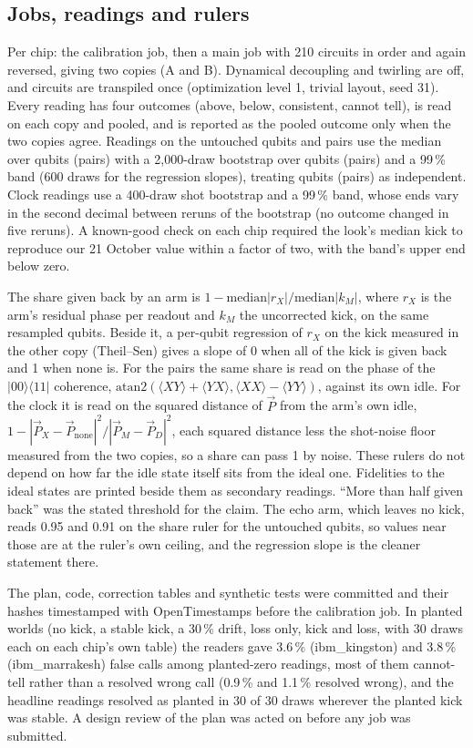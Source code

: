 \documentclass[reprint,amsmath,amssymb,aps,superscriptaddress,nofootinbib]{revtex4-2}
\begin{document}
\subsection{Jobs, readings and rulers}
Per chip: the calibration job, then a main job with 210 circuits in order and again reversed, giving two copies (A and B). Dynamical decoupling and twirling are off, and circuits are transpiled once (optimization level 1, trivial layout, seed 31). Every reading has four outcomes (above, below, consistent, cannot tell), is read on each copy and pooled, and is reported as the pooled outcome only when the two copies agree. Readings on the untouched qubits and pairs use the median over qubits (pairs) with a 2{,}000-draw bootstrap over qubits (pairs) and a 99\,\% band (600 draws for the regression slopes), treating qubits (pairs) as independent. Clock readings use a 400-draw shot bootstrap and a 99\,\% band, whose ends vary in the second decimal between reruns of the bootstrap (no outcome changed in five reruns). A known-good check on each chip required the look's median kick to reproduce our 21 October value within a factor of two, with the band's upper end below zero.

The share given back by an arm is $1-\mathrm{median}|r_X|/\mathrm{median}|k_M|$, where $r_X$ is the arm's residual phase per readout and $k_M$ the uncorrected kick, on the same resampled qubits. Beside it, a per-qubit regression of $r_X$ on the kick measured in the other copy (Theil--Sen) gives a slope of 0 when all of the kick is given back and 1 when none is. For the pairs the same share is read on the phase of the $|00\rangle\langle 11|$ coherence, $\mathrm{atan2}(\langle XY\rangle+\langle YX\rangle,\langle XX\rangle-\langle YY\rangle)$, against its own idle. For the clock it is read on the squared distance of $\vec{P}$ from the arm's own idle, $1-|\vec{P}_X-\vec{P}_\mathrm{none}|^2/|\vec{P}_M-\vec{P}_D|^2$, each squared distance less the shot-noise floor measured from the two copies, so a share can pass 1 by noise. These rulers do not depend on how far the idle state itself sits from the ideal one. Fidelities to the ideal states are printed beside them as secondary readings. ``More than half given back'' was the stated threshold for the claim. The echo arm, which leaves no kick, reads 0.95 and 0.91 on the share ruler for the untouched qubits, so values near those are at the ruler's own ceiling, and the regression slope is the cleaner statement there.

The plan, code, correction tables and synthetic tests were committed and their hashes timestamped with OpenTimestamps before the calibration job. In planted worlds (no kick, a stable kick, a 30\,\% drift, loss only, kick and loss, with 30 draws each on each chip's own table) the readers gave 3.6\,\% (ibm\_kingston) and 3.8\,\% (ibm\_marrakesh) false calls among planted-zero readings, most of them cannot-tell rather than a resolved wrong call (0.9\,\% and 1.1\,\% resolved wrong), and the headline readings resolved as planted in 30 of 30 draws wherever the planted kick was stable. A design review of the plan was acted on before any job was submitted.
\end{document}
